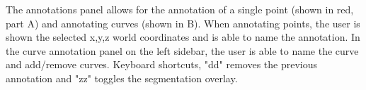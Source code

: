\label{fig:annotate}
The annotations panel allows for the annotation of a single point (shown in red, part A) and annotating curves (shown in B). When annotating points, the user is shown the selected x,y,z world coordinates and is able to name the annotation. In the curve annotation panel on the left sidebar, the user is able to name the curve and add/remove curves. Keyboard shortcuts, "dd" removes the previous annotation and "zz" toggles the segmentation overlay.  